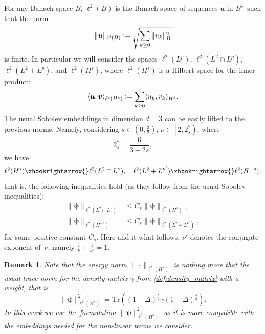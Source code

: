 \documentclass[12pt,a4paper]{amsart}
\newtheorem{remark}[theorem]{Remark}
\numberwithin{equation}{section}
\newcommand{\ulu}{\boldsymbol{u}}
\newcommand{\ulv}{\boldsymbol{v}}
\newcommand{\ulpsi}{\boldsymbol{\psi}}
\newcommand{\twoasts}{{2^*_s}}
\begin{document}
	For any Banach space $B$,   $\ell^2 (B)$ is the Banach space of sequences $ \ulu $ in $B^\mathbb{N}$ such that the norm
	\begin{equation}
		\|  \ulu  \|_{	\ell^2(B)} \vcentcolon = \sqrt{ \sum_{k \geq 0}  \| u_k \|_{B}^2 }
	\end{equation}
	is finite.
	In particular we will consider the spaces $ \ell^2 (L^p) $, $ \ell^2 (L^2\cap L^p) $, $ \ell^2 (L^2+ L^p) $, %
	and $ \ell^2 (H^s) $, %
	where $ \ell^2 (H^s) $ is a Hilbert space for the inner product:
	\begin{equation}
		\langle \ulu  , \ulv  \rangle_{\ell^2 (H^s) } \vcentcolon = \sum_{k \geq 0}  \langle u_k, v_k \rangle_{H^s} .
	\end{equation}
	The usual Sobolev embeddings in dimension $ d=3$ can be easily lifted to the previous norms. Namely, considering $s\in(0,\frac32)$, $\nu \in \left[2, \twoasts \right) $, where $$\twoasts=\frac{6}{3-2s},$$ we have
	\begin{equation}
		\ell^2(H^{s}) \xhookrightarrow{} \ell^2(L^2\cap L^\nu), \quad \ell^2(L^2+ L^{\nu^\prime}) \xhookrightarrow{}  \ell^2(H^{-s}),
	\end{equation}
	that is, the following inequalities hold (as they follow from the usual Sobolev inequalities):
	\begin{align}
		\label{eq:sobolev_embedding_plus}
		\| \ulpsi \|_{ \ell^2(L^2\cap L^\nu)} &\leq  C_{s} \| \ulpsi \|_{ \ell^2(H^{s})}, \\
		\label{eq:sobolev_embedding_minus}
		\| \ulpsi \|_{ \ell^2(H^{-s})} &\leq  C_{s} \| \ulpsi \|_{ \ell^2(L^2+ L^{\nu^\prime})},
	\end{align}
	for some positive constant $C_s$. Here and it what follows, $\nu'$ denotes the conjugate exponent of~$\nu$, namely $\frac1\nu+\frac{1}{\nu'}=1$.
	
	\begin{remark}
		Note that the energy norm $ \| \cdot \|_{\ell^2(H^s)}$ is nothing more that the usual trace norm for the density matrix $\gamma$ from \eqref{def:density_matrix} with a weight, that is
		\begin{equation}
			\| \ulpsi \|_{\ell^2(H^s)}^2 = \mathrm{Tr}( (1-\Delta)^{\frac{s}{2}} \gamma (1-\Delta)^{\frac{s}{2}}  ) .
		\end{equation}
		In this work we use the formulation $ \| \ulpsi \|_{\ell^2(H^s)}^2 $  as it is more compatible with the embeddings needed for the non-linear terms we consider. 
	\end{remark}
	
\end{document}
